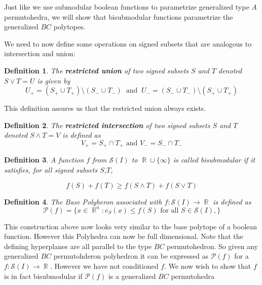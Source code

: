 \documentclass[12pt]{amsart}
\newtheorem{definition}{Definition}
\numberwithin{equation}{section}
\newcommand{\RR}{\operatorname{\mathbb{R}}}
\newcommand{\pp}{\mathcal{P}}
\newcommand{\si}{\mathcal{S}}
\begin{document}
Just like we use submodular boolean functions to parametrize generalized type $A$ permutohedra, we will show that  bisubmodular functions
 parametrize the generalized $BC$ polytopes.  

 We need to now define some operations on signed subsets that are analogous to intersection and union: 
 
 \begin{definition}
 The {\bf restricted union} of two signed subsets $S$ and $T$ denoted $S\vee T =U$ is given by 
 $$ U_+ = (S_+\cup T_+)\setminus(S_-\cup T_-) \   \text{   and    }  \ U_- = (S_-\cup T_-) \setminus(S_+\cup T_+)$$ 
 \end{definition}
This definition assures us that the restricted union always exists.  


\begin{definition}  The {\bf restricted intersection} of two signed subsets $S$ and $T$ denoted $S\wedge T= V$ is defined as
$$ V_+ = S_+\cap T_+ \text{   and    } V_-= S_-\cap T_- $$ 
 \end{definition}



\begin{definition}

A function $f$ from $\mathcal{S}(I)$ to $\RR\cup \{\infty\}$ is called {\em bisubmodular} if it satisfies, for all signed subsets $S $,$T$,

$$ f(S)+f(T)\geq f(S\wedge T)+f(S\vee T) $$

\end{definition}

 
\vspace{.5cm}          %


 
\begin{definition}
The {\em Base Polyheron} associated with  $f: \mathcal{S}(I) \rightarrow \RR$ is defined as
 $$\pp(f)=\{ x\in \RR^n : e_S(x) \leq f(S) \text{ for all }  S \in \si(I), \}$$
\end{definition}

This construction above now looks very similar to the base polytope of a boolean function. However this Polyhedra
can now be full dimensional.   Note that the defining hyperplanes are all parallel to the type $BC$ permutohedron. So given 
any generalized $BC$ permutohderon polyhedron it can be expressed as $\pp(f)$ for a $f: \si(I) \rightarrow \RR$. 
However we have not conditioned $f$. We now wish to show that $f$ is in fact bisubmodular if $\pp(f)$ is a generalized $BC$
permutohedra
\end{document}
